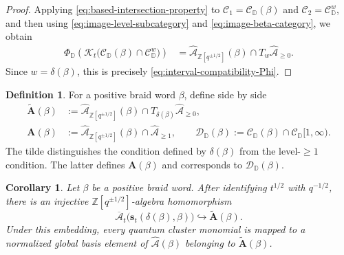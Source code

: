 \documentclass[12pt, reqno]{amsart}
\theoremstyle{plain}
\newtheorem{corollary}[theorem]{Corollary}
\theoremstyle{definition}
\newtheorem{definition}[theorem]{Definition}
\numberwithin{equation}{section}
\newcommand{\ZZ}{\mathbb{Z}}
\newcommand{\DD}{\mathbb{D}}
\newcommand{\cA}{\mathcal{A}}
\begin{document}
\begin{proof}
Applying \eqref{eq:based-intersection-property} to
\(\mathscr C_1=\mathscr C_{\DD}(\beta)\) and
\(\mathscr C_2=\mathscr C_{\DD}^{w}\), and then using
\eqref{eq:image-level-subcategory} and
\eqref{eq:image-beta-category}, we obtain
\begin{equation*}
\begin{aligned}
    \Phi_{\DD}\!\left(
        \mathcal{K}_t\bigl(
            \mathscr C_{\DD}(\beta)
            \cap
            \mathscr C_{\DD}^{w}
        \bigr)
    \right)
    &=
    \widehat{\cA}_{\ZZ[q^{\pm1/2}]}(\beta)
    \cap
    T_w\widehat{\cA}_{\geq0}.
\end{aligned}
\end{equation*}
Since \(w=\delta(\beta)\), this is precisely
\eqref{eq:interval-compatibility-Phi}.
\end{proof}

\begin{definition}\label{def:two-level-subalgebras}
For a positive braid word \(\beta\), define side by side
\begin{align}
    \widetilde{\mathbf A}(\beta)
    &:=
    \widehat{\cA}_{\ZZ[q^{\pm1/2}]}(\beta)
    \cap
    T_{\delta(\beta)}\widehat{\cA}_{\geq0},
    \label{eq:A-beta-definition}\\
    \mathbf A(\beta)
    &:=
    \widehat{\cA}_{\ZZ[q^{\pm1/2}]}(\beta)
    \cap\widehat{\cA}_{\geq1},
    \qquad
    \mathscr D_{\DD}(\beta)
    :=
    \mathscr C_{\DD}(\beta)
    \cap\mathscr C_{\DD}[1,\infty).
    \label{eq:A-D-beta-definition}
\end{align}
The tilde distinguishes the condition defined by \(\delta(\beta)\)
from the level-\(\geq1\) condition. The latter defines
\(\mathbf A(\beta)\) and corresponds to
\(\mathscr D_{\DD}(\beta)\).
\end{definition}

\begin{corollary}\label{cor:cluster-algebra-embedding-A-beta}
Let \(\beta\) be a positive braid word. After identifying \(t^{1/2}\) with
\(q^{-1/2}\), there is an injective
\(\ZZ[q^{\pm1/2}]\)-algebra homomorphism
\begin{equation}\label{eq:cluster-algebra-embedding-A-beta}
    \overline{\mathcal A}_t
    \bigl(\mathbf s_t(\delta(\beta),\beta)\bigr)
    \hookrightarrow
    \widetilde{\mathbf A}(\beta).
\end{equation}
Under this embedding, every quantum cluster monomial is mapped to a
normalized global basis element of \(\widehat{\cA}(\beta)\) belonging
to \(\widetilde{\mathbf A}(\beta)\).
\end{corollary}
\end{document}
